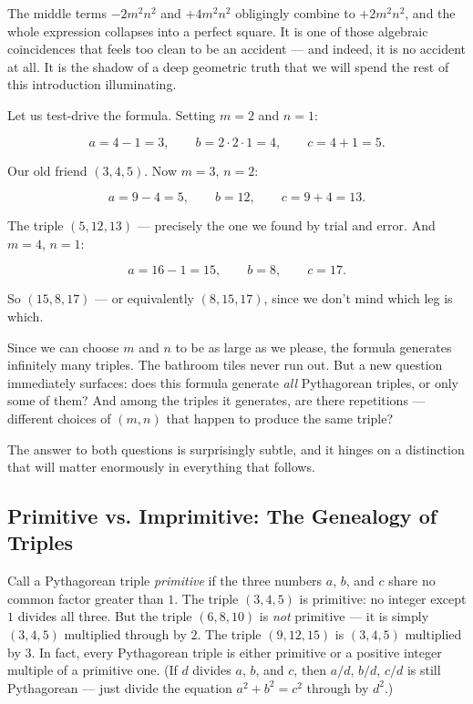 \documentclass[11pt,twoside,openright]{book}
\theoremstyle{definition}
\theoremstyle{remark}
\begin{document}
The middle terms $-2m^2 n^2$ and $+4m^2 n^2$ obligingly combine to $+2m^2 n^2$, and the whole expression collapses into a perfect square. It is one of those algebraic coincidences that feels too clean to be an accident --- and indeed, it is no accident at all. It is the shadow of a deep geometric truth that we will spend the rest of this introduction illuminating.

Let us test-drive the formula. Setting $m = 2$ and $n = 1$:

\[a = 4 - 1 = 3, \qquad b = 2 \cdot 2 \cdot 1 = 4, \qquad c = 4 + 1 = 5.\]

Our old friend $(3, 4, 5)$. Now $m = 3$, $n = 2$:

\[a = 9 - 4 = 5, \qquad b = 12, \qquad c = 9 + 4 = 13.\]

The triple $(5, 12, 13)$ --- precisely the one we found by trial and error. And $m = 4$, $n = 1$:

\[a = 16 - 1 = 15, \qquad b = 8, \qquad c = 17.\]

So $(15, 8, 17)$ --- or equivalently $(8, 15, 17)$, since we don't mind which leg is which.


Since we can choose $m$ and $n$ to be as large as we please, the formula generates infinitely many triples. The bathroom tiles never run out. But a new question immediately surfaces: does this formula generate \textit{all} Pythagorean triples, or only some of them? And among the triples it generates, are there repetitions --- different choices of $(m, n)$ that happen to produce the same triple?

The answer to both questions is surprisingly subtle, and it hinges on a distinction that will matter enormously in everything that follows.


\subsection{Primitive vs. Imprimitive: The Genealogy of Triples}

Call a Pythagorean triple \textit{primitive} if the three numbers $a$, $b$, and $c$ share no common factor greater than $1$. The triple $(3, 4, 5)$ is primitive: no integer except $1$ divides all three. But the triple $(6, 8, 10)$ is \textit{not} primitive --- it is simply $(3, 4, 5)$ multiplied through by $2$. The triple $(9, 12, 15)$ is $(3, 4, 5)$ multiplied by $3$. In fact, every Pythagorean triple is either primitive or a positive integer multiple of a primitive one. (If $d$ divides $a$, $b$, and $c$, then $a/d$, $b/d$, $c/d$ is still Pythagorean --- just divide the equation $a^2 + b^2 = c^2$ through by $d^2$.)
\end{document}
